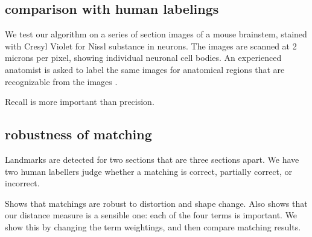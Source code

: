 \documentclass{llncs}
\begin{document}
\subsection{comparison with human labelings}

We test our algorithm on a series of section images of a mouse brainstem, stained with Cresyl Violet for Nissl substance in neurons. The images are scanned at 2 microns per pixel, showing individual neuronal cell bodies. An experienced anatomist is asked to label the same images for anatomical regions that are recognizable from the images .



Recall is more important than precision.

\subsection{robustness of matching}

Landmarks are detected for two sections that are three sections apart. We have two human labellers judge whether a matching is correct, partially correct, or incorrect.





Shows that matchings are robust to distortion and shape change.
Also shows that our distance measure is a sensible one: each of the four terms is important. We show this by changing the term weightings, and then compare matching results.
\end{document}
